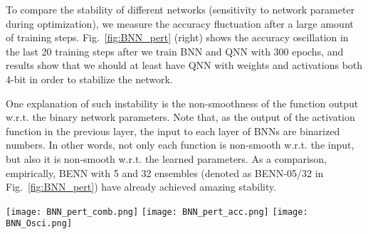 \documentclass[10pt,twocolumn,letterpaper]{article}
\begin{document}
To compare the stability of different networks (sensitivity to network parameter during optimization), we measure the accuracy fluctuation after a large amount of training steps. Fig.~\ref{fig:BNN_pert} (right) shows the accuracy oscillation in the last 20 training steps after we train BNN and QNN with 300 epochs, and results show that we should at least have QNN with weights and activations both 4-bit in order to stabilize the network.

One explanation of such instability is the non-smoothness of the function output w.r.t. the binary network parameters. Note that, as the output of the activation function in the previous layer, the input to each layer of BNNs are binarized numbers. In other words, not only each function is non-smooth w.r.t. the input, but also it is non-smooth w.r.t. the learned parameters.  As a comparison, empirically, BENN with 5 and 32 ensembles (denoted as BENN-05/32 in Fig.~\ref{fig:BNN_pert}) have already achieved amazing stability.


\begin{figure*}[ht!]
    \vspace{-2mm}
    \texttt{[image: BNN\_pert\_comb.png]}
    \label{fig:pert_1}
    \endminipage\hfill
    \texttt{[image: BNN\_pert\_acc.png]}
    \label{fig:pert_2}
    \endminipage\hfill
    \texttt{[image: BNN\_Osci.png]}
    \label{fig:pert_2}
    \endminipage\hfill
    \vspace{-3mm}
    \caption{{\small \textbf{Left: }BNN has large output variation (robustness issue). \textbf{Middle: }BNN has large variation of prediction accuracy (robustness issue). \textbf{Right: }BNN has large test accuracy variation during training (instability issue). BENN can cure these problems. Here, the perturbation variance is 0.01. \textit{(*QNN-W1A2 denotes QNN with 1-bit weights and 2-bit activations and so do others.)}}}
    \label{fig:BNN_pert}
    \vspace{-5mm}
\end{figure*}
\end{document}
